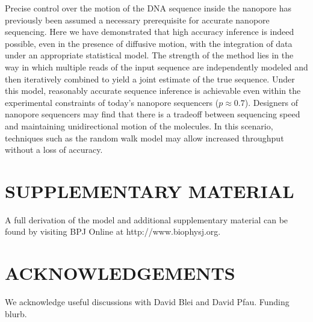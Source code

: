 \documentclass{biophys_letter}
\begin{document}

Precise control over the motion of the DNA sequence inside the nanopore has previously been assumed a necessary prerequisite for accurate nanopore sequencing.
Here we have demonstrated that high accuracy inference is indeed possible, even in the presence of diffusive motion, with the integration of data under an appropriate statistical model. 
The strength of the method lies in the way in which multiple reads of the input sequence are independently modeled and then iteratively combined to yield a joint estimate of the true sequence.
Under this model, reasonably accurate sequence inference is achievable even within the experimental constraints of today's nanopore sequencers ($p \approx 0.7$).
Designers of nanopore sequencers may find that there is a tradeoff between sequencing speed and maintaining unidirectional motion of the molecules.
In this scenario, techniques such as the random walk model may allow increased throughput without a loss of accuracy.

\section*{SUPPLEMENTARY MATERIAL}

A full derivation of the model and additional supplementary material can be found by visiting BPJ Online at http://www.biophysj.org.\vspace*{6pt}

\section*{ACKNOWLEDGEMENTS}

We acknowledge useful discussions with David Blei and David Pfau. Funding blurb.
\end{document}
